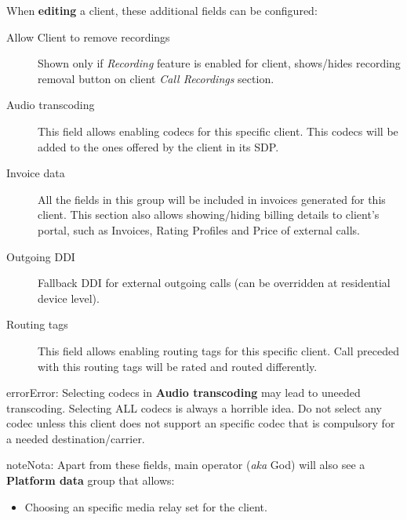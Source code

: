 \documentclass[letterpaper,10pt,spanish]{sphinxmanual}
\begin{document}
When \textbf{editing} a client, these additional fields can be configured:
\begin{description}
\item[{Allow Client to remove recordings}] \leavevmode{}\label{administration_portal/brand/clients/retail:term-allow-client-to-remove-recordings}
Shown only if \emph{Recording} feature is enabled for client, shows/hides recording
removal button on client \emph{Call Recordings} section.

\item[{Audio transcoding}] \leavevmode{}\label{administration_portal/brand/clients/retail:term-audio-transcoding}
This field allows enabling codecs for this specific client. This codecs will be added to
the ones offered by the client in its SDP.

\item[{Invoice data}] \leavevmode{}\label{administration_portal/brand/clients/retail:term-invoice-data}
All the fields in this group will be included in invoices generated for this client. This section also allows
showing/hiding billing details to client's portal, such as Invoices, Rating Profiles and Price of external calls.

\item[{Outgoing DDI}] \leavevmode{}\label{administration_portal/brand/clients/retail:term-outgoing-ddi}
Fallback DDI for external outgoing calls (can be overridden at residential device level).

\item[{Routing tags}] \leavevmode{}\label{administration_portal/brand/clients/retail:term-routing-tags}
This field allows enabling routing tags for this specific client. Call preceded with this
routing tags will be rated and routed differently.

\end{description}

\begin{notice}{error}{Error:}
Selecting codecs in \textbf{Audio transcoding} may lead to uneeded transcoding. Selecting ALL codecs is
always a horrible idea. Do not select any codec unless this client does not support an specific codec
that is compulsory for a needed destination/carrier.
\end{notice}

\begin{notice}{note}{Nota:}
Apart from these fields, main operator (\emph{aka} God) will also see a \textbf{Platform data} group that allows:
\begin{itemize}
\item {} 
Choosing an specific media relay set for the client.

\end{itemize}
\end{notice}
\end{document}

